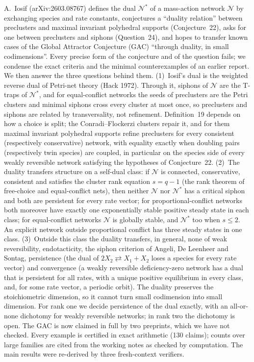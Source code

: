 \documentclass[11pt,a4paper]{report}
\newcommand{\Net}{\mathcal{N}}
\newcommand{\Nd}{\mathcal{N}^{*}}
\begin{document}
\makepapertitle

\begin{paperabstract}
A.~Iosif (arXiv:2603.08767) defines the dual \(\Nd\) of a mass-action network \(\Net\) by exchanging species and rate
constants, conjectures a ``duality relation'' between preclusters and maximal invariant polyhedral supports
(Conjecture~22), asks for one between preclusters and siphons (Question~24), and hopes to transfer known cases of
the Global Attractor Conjecture (GAC) ``through duality, in small codimensions''. Every precise form of the
conjecture and of the question fails; we condense the exact criteria and the minimal counterexamples of an earlier
report. We then answer the three questions behind them. (1)~Iosif's dual is the weighted reverse dual of Petri-net
theory (Hack 1972). Through it, siphons of \(\Net\) are the T-traps of \(\Nd\), and for equal-conflict networks the
seeds of preclusters are the Petri clusters and minimal siphons cross every cluster at most once, so preclusters and
siphons are related by transversality, not refinement. Definition~19 depends on how a choice is split; the Conradi--Flockerzi clusters
repair it, and for them maximal invariant polyhedral supports refine preclusters for every consistent
(respectively conservative) network, with equality exactly when doubling pairs (respectively twin species) are
coupled, in particular on the
species side of every weakly reversible network satisfying the hypotheses of Conjecture~22. (2)~The duality
transfers structure on a self-dual class: if \(\Net\) is connected, conservative, consistent and satisfies the
cluster rank equation \(s=q-1\) (the rank theorem of free-choice and equal-conflict nets), then neither \(\Net\) nor
\(\Nd\) has a critical siphon and both are persistent for every rate vector; for proportional-conflict networks
both moreover have exactly one exponentially stable positive steady state in each class; for equal-conflict
networks \(\Net\) is globally stable, and \(\Nd\) too when \(s\le2\). An explicit network outside proportional
conflict has three steady states in one class. (3)~Outside this class the duality transfers, in general, none of weak
reversibility, endotacticity, the siphon criterion of Angeli, De Leenheer and Sontag, persistence (the dual of
\(2X_2\rightleftarrows X_1+X_2\) loses a species for every rate vector) and convergence (a weakly reversible
deficiency-zero network has a dual that is persistent for all rates, with a unique positive equilibrium in every
class, and, for some rate vector, a periodic orbit). The duality preserves the stoichiometric dimension, so it cannot turn small
codimension into small dimension. For rank one we decide persistence of the dual exactly, with an all-or-none
dichotomy for weakly reversible networks; in rank two the dichotomy is open. The GAC is now claimed in full by two
preprints, which we have not checked. Every example is certified in exact arithmetic (130 claims); counts over large
families are cited from the working notes as checked by computation. The main results were re-derived by three
fresh-context verifiers.
\end{paperabstract}
\end{document}
